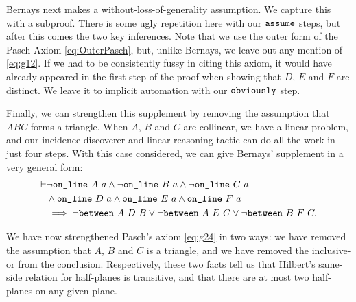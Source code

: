 Bernays next makes a without-loss-of-generality assumption. We capture this with a subproof. There is some ugly repetition here with our $\texttt{assume}$ steps, but after this comes the two key inferences. Note that we use the outer form of the Pasch Axiom \eqref{eq:OuterPasch}, but, unlike Bernays, we leave out any mention of \eqref{eq:g12}. If we had to be consistently fussy in citing this axiom, it would have already appeared in the first step of the proof when showing that $D$, $E$ and $F$ are distinct. We leave it to implicit automation with our $\texttt{obviously}$ step.

Finally, we can strengthen this supplement by removing the assumption that $ABC$ forms a triangle. When $A$, $B$ and $C$ are collinear, we have a linear problem, and our incidence discoverer and linear reasoning tactic can do all the work in just four steps. With this case considered, we can give Bernays' supplement in a very general form:
\begin{equation}\label{eq:SupplementI}
  \begin{split}
    \vdash&\neg\code{on\_line}\ A\ a \wedge \neg\code{on\_line}\ B\ a \wedge \neg\code{on\_line}\ C\ a\\
    &\wedge \code{on\_line}\ D\ a \wedge \code{on\_line}\ E\ a \wedge \code{on\_line}\ F\ a\\
    &\implies \neg\between{A}{D}{B} \vee \neg\between{A}{E}{C} \vee \neg\between{B}{F}{C}.
  \end{split}
\end{equation}

We have now strengthened Pasch's axiom \eqref{eq:g24} in two ways: we have removed the assumption that $A$, $B$ and $C$ is a triangle, and we have removed the inclusive-or from the conclusion. Respectively, these two facts tell us that Hilbert's same-side relation for half-planes is transitive, and that there are at most two half-planes on any given plane.


